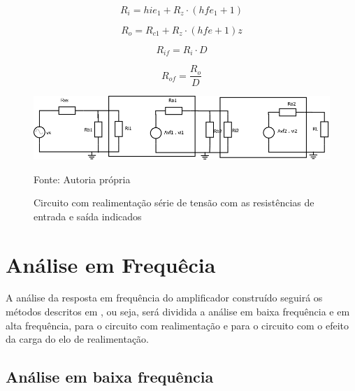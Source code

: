 \documentclass[openright]{normas-utf-tex} %
\begin{document}
\begin{equation} \label{eq:resistencia_i_2}
R_i = hie_1 + R_z \cdot (hfe_1+1)
\end{equation}



\begin{equation}\label{eq:resistencia_o_2}
R_o = R_{c1} + R_z \cdot (hfe+1)
z\end{equation}



\begin{equation}\label{eq:resistencia_if_2}
R_{if} =R_i\cdot D
\end{equation}


\begin{equation}\label{eq:resistencia_of_2}
R_{of} = \frac{R_o}{D}
\end{equation}


\begin{figure}[H]
\centering
\includegraphics[width=0.75\linewidth]{img/CircuitoRealimentacaoTensaoSerieResistencias.png}
\caption{Circuito com realimentação série de tensão com as resistências de entrada e saída indicados}
Fonte: Autoria própria
\label{fig:circuito_real_resistencia}
\end{figure}


\section{Análise em Frequêcia}
\label{sec:ana_freq}

A análise da resposta em frequência do amplificador construído seguirá os métodos descritos em , ou seja, será dividida a análise em baixa frequência e em alta frequência, para o circuito com realimentação e para o circuito com o efeito da carga do elo de realimentação. 
\subsection{Análise em baixa frequência}
\end{document}
